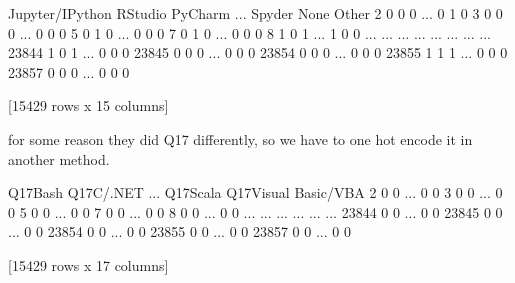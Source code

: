 \documentclass[letterpaper,10pt,english]{jupyterBook}
\begin{document}
\begin{sphinxVerbatim}[commandchars=\\\{\}]
       Jupyter/IPython  RStudio  PyCharm  ...  Spyder  None  Other
2                    0        0        0  ...       0     1      0
3                    0        0        0  ...       0     0      0
5                    0        1        0  ...       0     0      0
7                    0        1        0  ...       0     0      0
8                    1        0        1  ...       1     0      0
...                ...      ...      ...  ...     ...   ...    ...
23844                1        0        1  ...       0     0      0
23845                0        0        0  ...       0     0      0
23854                0        0        0  ...       0     0      0
23855                1        1        1  ...       0     0      0
23857                0        0        0  ...       0     0      0

[15429 rows x 15 columns]
\end{sphinxVerbatim}

\sphinxAtStartPar
for some reason they did Q17 differently, so we have to one hot encode it in another method.

\begin{sphinxVerbatim}[commandchars=\\\{\}]
\PYG{p}{[}\PYG{p}{]}  \PYG{p}{[}\PYG{p}{[}\PYG{p}{]}\PYG{p}{[}\PYG{p}{]}\PYG{p}{]}
\PYG{p}{[}\PYG{p}{]}
\end{sphinxVerbatim}

\begin{sphinxVerbatim}[commandchars=\\\{\}]
       Q17\PYGZus{}Bash  Q17\PYGZus{}C\PYGZsh{}/.NET  ...  Q17\PYGZus{}Scala  Q17\PYGZus{}Visual Basic/VBA
2             0            0  ...          0                     0
3             0            0  ...          0                     0
5             0            0  ...          0                     0
7             0            0  ...          0                     0
8             0            0  ...          0                     0
...         ...          ...  ...        ...                   ...
23844         0            0  ...          0                     0
23845         0            0  ...          0                     0
23854         0            0  ...          0                     0
23855         0            0  ...          0                     0
23857         0            0  ...          0                     0

[15429 rows x 17 columns]
\end{sphinxVerbatim}
\end{document}
